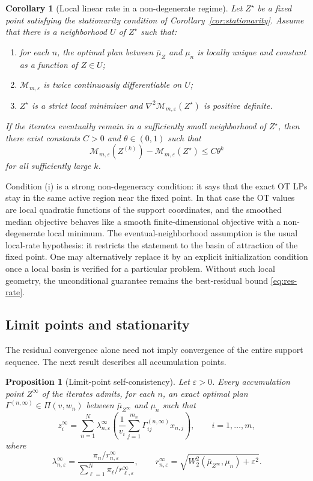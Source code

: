 \documentclass[pdflatex,sn-mathphys-ay]{sn-jnl}%
\theoremstyle{thmstyleone}%
\newtheorem{proposition}[theorem]{Proposition}%
\newtheorem{corollary}[theorem]{Corollary}
\theoremstyle{thmstyletwo}%
\theoremstyle{thmstylethree}%
\newcommand{\calM}{\mathcal M}
\newcommand{\eps}{\varepsilon}
\newcommand{\barmu}{\bar\mu}
\begin{document}
\begin{corollary}[Local linear rate in a non-degenerate regime]\label{cor:local-rate}
Let \(Z^\star\) be a fixed point satisfying the stationarity condition of Corollary~\ref{cor:stationarity}. Assume that there is a neighborhood \(U\) of \(Z^\star\) such that:
\begin{enumerate}[label=(\roman{enumi})]
    \item for each \(n\), the optimal plan between \(\barmu_Z\) and \(\mu_n\) is locally unique and constant as a function of \(Z\in U\);
    \item \(\calM_{m,\eps}\) is twice continuously differentiable on \(U\);
    \item \(Z^\star\) is a strict local minimizer and \(\nabla^2\calM_{m,\eps}(Z^\star)\) is positive definite.
\end{enumerate}
If the iterates eventually remain in a sufficiently small neighborhood of \(Z^\star\), then there exist constants \(C>0\) and \(\theta\in(0,1)\) such that
\[
    \calM_{m,\eps}(Z^{(k)})-\calM_{m,\eps}(Z^\star)
    \le C\theta^{k}
\]
for all sufficiently large \(k\).
\end{corollary}

Condition (i) is a strong non-degeneracy condition: it says that the exact OT LPs stay in the same active region near the fixed point. In that case the OT values are local quadratic functions of the support coordinates, and the smoothed median objective behaves like a smooth finite-dimensional objective with a non-degenerate local minimum. The eventual-neighborhood assumption is the usual local-rate hypothesis: it restricts the statement to the basin of attraction of the fixed point. One may alternatively replace it by an explicit initialization condition once a local basin is verified for a particular problem. Without such local geometry, the unconditional guarantee remains the best-residual bound \eqref{eq:res-rate}.

\subsection{Limit points and stationarity}

The residual convergence alone need not imply convergence of the entire support sequence. The next result describes all accumulation points.

\begin{proposition}[Limit-point self-consistency]\label{prop:limit}
Let \(\eps>0\). Every accumulation point \(Z^\infty\) of the iterates admits, for each \(n\), an exact optimal plan \(\Gamma^{(n,\infty)}\in\Pi(v,w_n)\) between \(\barmu_{Z^\infty}\) and \(\mu_n\) such that
\begin{equation}\label{eq:limit-fp}
    z_i^\infty=
    \sum_{n=1}^N\lambda_{n,\eps}^\infty
    \left(\frac{1}{v_i}\sum_{j=1}^{m_n}\Gamma_{ij}^{(n,\infty)}x_{n,j}\right),
    \qquad i=1,\ldots,m,
\end{equation}
where
\[
    \lambda_{n,\eps}^\infty=
    \frac{\pi_n/r_{n,\eps}^\infty}
    {\sum_{\ell=1}^N\pi_\ell/r_{\ell,\eps}^\infty},
    \qquad
    r_{n,\eps}^\infty=\sqrt{W_2^2(\barmu_{Z^\infty},\mu_n)+\eps^2}.
\]
\end{proposition}
\end{document}
